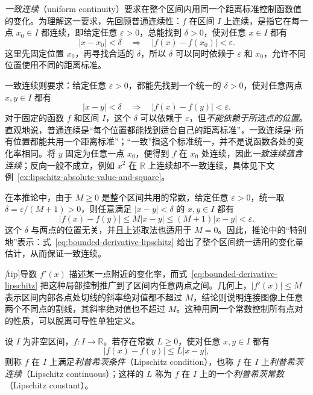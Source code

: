 \begin{notealert}[title={什么是一致连续}]
\emph{一致连续}（uniform continuity）要求在整个区间内用同一个距离标准控制函数值的变化。为理解这一要求，先回顾普通连续性：$f$ 在区间 $I$ 上连续，是指它在每一点 $x_0\in I$ 都连续，即给定任意 $\varepsilon>0$，总能找到 $\delta>0$，使对任意 $x\in I$ 都有
\[
    |x-x_0|<\delta\quad\Longrightarrow\quad|f(x)-f(x_0)|<\varepsilon.
\]
这里先固定位置 $x_0$，再寻找合适的 $\delta$，所以 $\delta$ 可以同时依赖于 $\varepsilon$ 和 $x_0$，允许不同位置使用不同的距离标准。

一致连续则要求：给定任意 $\varepsilon>0$，都能先找到一个统一的 $\delta>0$，使对任意两点 $x,y\in I$ 都有
\[
    |x-y|<\delta\quad\Longrightarrow\quad|f(x)-f(y)|<\varepsilon.
\]
对于固定的函数 $f$ 和区间 $I$，这个 $\delta$ 可以依赖于 $\varepsilon$，但\emph{不能依赖于所选点的位置}。直观地说，普通连续是“每个位置都能找到适合自己的距离标准”，一致连续是“所有位置都能共用一个距离标准”；“一致”指这个标准统一，并不是说函数各处的变化率相同。将 $y$ 固定为任意一点 $x_0$，便得到 $f$ 在 $x_0$ 处连续，因此\emph{一致连续蕴含连续}；反向一般不成立，例如 $x^2$ 在 $\mathbb{R}$ 上连续却不一致连续，具体见下文例~\ref{ex:lipschitz-absolute-value-and-square}。

在本推论中，由于 $M\geq0$ 是整个区间共用的常数，给定任意 $\varepsilon>0$，统一取 $\delta=\varepsilon/(M+1)>0$，则任意满足 $|x-y|<\delta$ 的 $x,y\in I$ 都有
\[
    |f(x)-f(y)|\leq M|x-y|\leq(M+1)|x-y|<\varepsilon.
\]
这个 $\delta$ 与两点的位置无关，并且上述取法也适用于 $M=0$。因此，推论中的“特别地”表示：式~\eqref{eq:bounded-derivative-lipschitz} 给出了整个区间统一适用的变化量估计，从而保证一致连续。
\end{notealert}

\emph[tip]{导数 $f'(x)$ 描述某一点附近的变化率，而式~\eqref{eq:bounded-derivative-lipschitz} 把这种局部控制推广到了区间内任意两点之间。几何上，$|f'(x)|\leq M$ 表示区间内部各点处切线的斜率绝对值都不超过 $M$，结论则说明连接图像上任意两个不同点的割线，其斜率绝对值也不超过 $M$。}这种用同一个常数控制所有点对的性质，可以脱离可导性单独定义。

\begin{definition}
\label{def:lipschitz-continuity}
设 $I$ 为非空区间，$f:I\to\mathbb{R}$。若存在常数 $L\geq0$，使对任意 $x,y\in I$ 都有
\[
    |f(x)-f(y)|\leq L|x-y|,
\]
则称 $f$ 在 $I$ 上满足\emph{利普希茨条件}（Lipschitz condition），也称 $f$ 在 $I$ 上\emph{利普希茨连续}（Lipschitz continuous）；这样的 $L$ 称为 $f$ 在 $I$ 上的一个\emph{利普希茨常数}（Lipschitz constant）。
\end{definition}

